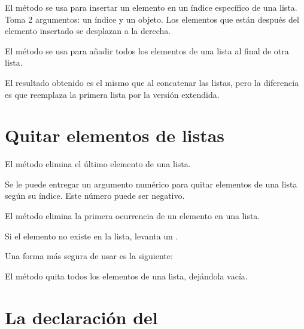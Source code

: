 El método  se usa para insertar un elemento en un índice específico de una lista. Toma 2 argumentos: un índice y un objeto. Los elementos que están después del elemento insertado se desplazan a la derecha.


El método  se usa para añadir todos los elementos de una lista al final de otra lista.
  

El resultado obtenido es el mismo que al concatenar las listas, pero la diferencia es que reemplaza la primera lista por la versión extendida.

\section{Quitar elementos de listas}

El método  elimina el último elemento de una lista.
  

Se le puede entregar un argumento numérico para quitar elementos de una lista según su índice. Este número puede ser negativo.


El método  elimina la primera ocurrencia de un elemento en una lista.
  

Si el elemento no existe en la lista, levanta un .


Una forma más segura de usar  es la siguiente:


El método  quita todos los elementos de una lista, dejándola vacía.


\section{La declaración del}

